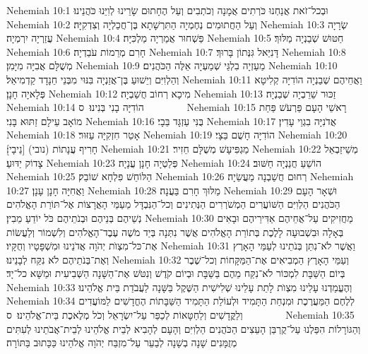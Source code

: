 Nehemiah 10:1	וּבְכל־זֹאת אֲנַחְנוּ כֹּרְתִים אֲמָנָה וְכֹתְבִים וְעַל הֶחָתוּם שָׂרֵינוּ לְוִיֵּנוּ כֹּהֲנֵינוּ׃
Nehemiah 10:2	וְעַל הַחֲתוּמִים נְחֶמְיָה הַתִּרְשָׁתָא בֶּן־חֲכַלְיָה וְצִדְקִיָּה׃
Nehemiah 10:3	שְׂרָיָה עֲזַרְיָה יִרְמְיָה׃
Nehemiah 10:4	פַּשְׁחוּר אֲמַרְיָה מַלְכִּיָּה׃
Nehemiah 10:5	חַטּוּשׁ שְׁבַנְיָה מַלּוּךְ׃
Nehemiah 10:6	חָרִם מְרֵמוֹת עֹבַדְיָה׃
Nehemiah 10:7	דָּנִיֵּאל גִּנְּתוֹן בָּרוּךְ׃
Nehemiah 10:8	מְשֻׁלָּם אֲבִיָּה מִיָּמִן׃
Nehemiah 10:9	מַעַזְיָה בִלְגַּי שְׁמַעְיָה אֵלֶּה הַכֹּהֲנִים׃
Nehemiah 10:10	וְהַלְוִיִּם וְיֵשׁוּעַ בֶּן־אֲזַנְיָה בִּנּוּי מִבְּנֵי חֵנָדָד קַדְמִיאֵל׃
Nehemiah 10:11	וַאֲחֵיהֶם שְׁבַנְיָה הוֹדִיָּה קְלִיטָא פְּלָאיָה חָנָן׃
Nehemiah 10:12	מִיכָא רְחוֹב חֲשַׁבְיָה׃
Nehemiah 10:13	זַכּוּר שֵׁרֵבְיָה שְׁבַנְיָה׃
Nehemiah 10:14	הוֹדִיָּה בָנִי בְּנִינוּ׃ {ס}        
Nehemiah 10:15	רָאשֵׁי הָעָם פַּרְעֹשׁ פַּחַת מוֹאָב עֵילָם זַתּוּא בָּנִי׃
Nehemiah 10:16	בֻּנִּי עַזְגָּד בֵּבָי׃
Nehemiah 10:17	אֲדֹנִיָּה בִגְוַי עָדִין׃
Nehemiah 10:18	אָטֵר חִזְקִיָּה עַזּוּר׃
Nehemiah 10:19	הוֹדִיָּה חָשֻׁם בֵּצָי׃
Nehemiah 10:20	חָרִיף עֲנָתוֹת (נובי) [נֵיבָי]׃
Nehemiah 10:21	מַגְפִּיעָשׁ מְשֻׁלָּם חֵזִיר׃
Nehemiah 10:22	מְשֵׁיזַבְאֵל צָדוֹק יַדּוּעַ׃
Nehemiah 10:23	פְּלַטְיָה חָנָן עֲנָיָה׃
Nehemiah 10:24	הוֹשֵׁעַ חֲנַנְיָה חַשּׁוּב׃
Nehemiah 10:25	הַלּוֹחֵשׁ פִּלְחָא שׁוֹבֵק׃
Nehemiah 10:26	רְחוּם חֲשַׁבְנָה מַעֲשֵׂיָה׃
Nehemiah 10:27	וַאֲחִיָּה חָנָן עָנָן׃
Nehemiah 10:28	מַלּוּךְ חָרִם בַּעֲנָה׃
Nehemiah 10:29	וּשְׁאָר הָעָם הַכֹּהֲנִים הַלְוִיִּם הַשּׁוֹעֲרִים הַמְשֹׁרְרִים הַנְּתִינִים וְכל־הַנִּבְדָּל מֵעַמֵּי הָאֲרָצוֹת אֶל־תּוֹרַת הָאֱלֹהִים נְשֵׁיהֶם בְּנֵיהֶם וּבְנֹתֵיהֶם כֹּל יוֹדֵעַ מֵבִין׃
Nehemiah 10:30	מַחֲזִיקִים עַל־אֲחֵיהֶם אַדִּירֵיהֶם וּבָאִים בְּאָלָה וּבִשְׁבוּעָה לָלֶכֶת בְּתוֹרַת הָאֱלֹהִים אֲשֶׁר נִתְּנָה בְּיַד מֹשֶׁה עֶבֶד־הָאֱלֹהִים וְלִשְׁמוֹר וְלַעֲשׂוֹת אֶת־כּל־מִצְוֺת יְהֹוָה אֲדֹנֵינוּ וּמִשְׁפָּטָיו וְחֻקָּיו׃
Nehemiah 10:31	וַאֲשֶׁר לֹא־נִתֵּן בְּנֹתֵינוּ לְעַמֵּי הָאָרֶץ וְאֶת־בְּנֹתֵיהֶם לֹא נִקַּח לְבָנֵינוּ׃
Nehemiah 10:32	וְעַמֵּי הָאָרֶץ הַמְבִיאִים אֶת־הַמַּקָּחוֹת וְכל־שֶׁבֶר בְּיוֹם הַשַּׁבָּת לִמְכּוֹר לֹא־נִקַּח מֵהֶם בַּשַּׁבָּת וּבְיוֹם קֹדֶשׁ וְנִטֹּשׁ אֶת־הַשָּׁנָה הַשְּׁבִיעִית וּמַשָּׁא כל־יָד׃
Nehemiah 10:33	וְהֶעֱמַדְנוּ עָלֵינוּ מִצְוֺת לָתֵת עָלֵינוּ שְׁלִישִׁית הַשֶּׁקֶל בַּשָּׁנָה לַעֲבֹדַת בֵּית אֱלֹהֵינוּ׃
Nehemiah 10:34	לְלֶחֶם הַמַּעֲרֶכֶת וּמִנְחַת הַתָּמִיד וּלְעוֹלַת הַתָּמִיד הַשַּׁבָּתוֹת הֶחֳדָשִׁים לַמּוֹעֲדִים וְלַקֳּדָשִׁים וְלַחַטָּאוֹת לְכַפֵּר עַל־יִשְׂרָאֵל וְכֹל מְלֶאכֶת בֵּית־אֱלֹהֵינוּ׃ {ס}        
Nehemiah 10:35	וְהַגּוֹרָלוֹת הִפַּלְנוּ עַל־קֻרְבַּן הָעֵצִים הַכֹּהֲנִים הַלְוִיִּם וְהָעָם לְהָבִיא לְבֵית אֱלֹהֵינוּ לְבֵית־אֲבֹתֵינוּ לְעִתִּים מְזֻמָּנִים שָׁנָה בְשָׁנָה לְבַעֵר עַל־מִזְבַּח יְהֹוָה אֱלֹהֵינוּ כַּכָּתוּב בַּתּוֹרָה׃
